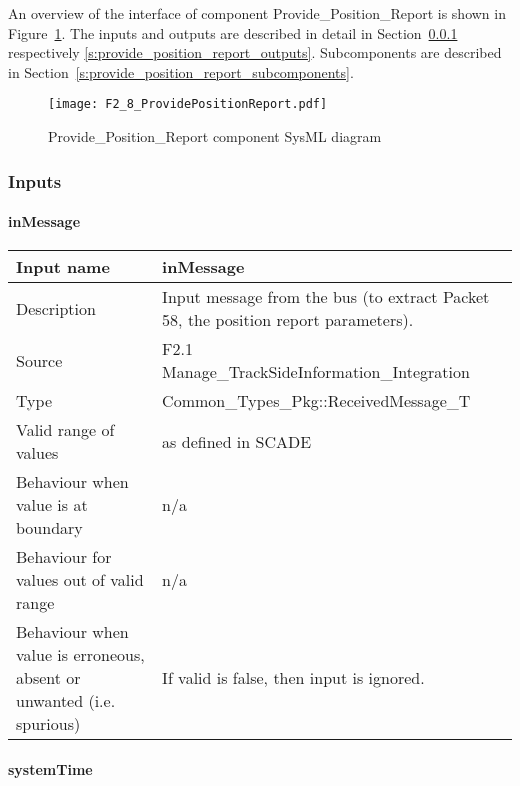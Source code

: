 An overview of the interface of component Provide\_Position\_Report is shown in Figure~\ref{f:provide_position_report_interface}. The inputs and outputs are described in detail in Section~\ref{s:provide_position_report_inputs} respectively \ref{s:provide_position_report_outputs}. Subcomponents are described in Section~\ref{s:provide_position_report_subcomponents}.

\begin{figure}
\center
\texttt{[image: F2\_8\_ProvidePositionReport.pdf]}
\caption{Provide\_Position\_Report component SysML diagram}\label{f:provide_position_report_interface}
\end{figure}


\subsubsection{Inputs}\label{s:provide_position_report_inputs}

\paragraph{inMessage}

\begin{longtable}{p{}p{}}
\toprule
Input name				& inMessage \\
\midrule
Description				& Input message from the bus (to extract Packet 58, the position report parameters). \\
\midrule
Source					& F2.1 Manage\_TrackSideInformation\_Integration\\ 
\midrule
Type					& Common\_Types\_Pkg::ReceivedMessage\_T \\
\midrule
Valid range of values	& as defined in SCADE \\
\midrule
Behaviour when value is at boundary	& n/a \\
\midrule
Behaviour for values out of valid range	& n/a \\
\midrule
Behaviour when value is erroneous, absent or unwanted (i.e. spurious) & If valid is false, then input is ignored. \\
\bottomrule
\end{longtable}


\paragraph{systemTime}

